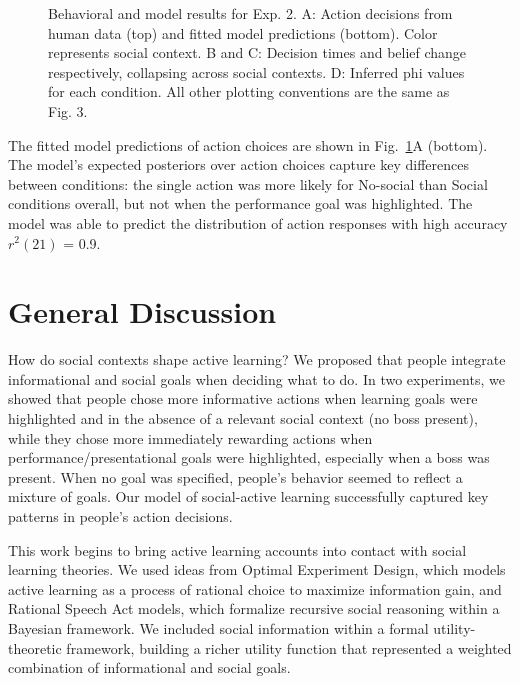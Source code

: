 \documentclass[10pt, letterpaper]{article}
\newenvironment{CodeChunk}{}{}
\begin{document}
\begin{CodeChunk}
\begin{figure}[H]
{}

\caption[Behavioral and model results for Exp]{Behavioral and model results for Exp. 2. A: Action decisions from human data (top) and fitted model predictions (bottom). Color represents social context. B and C: Decision times and belief change respectively, collapsing across social contexts. D: Inferred phi values for each condition. All other plotting conventions are the same as Fig. 3.}\label{fig:e2_results}
\end{figure}
\end{CodeChunk}

The fitted model predictions of action choices are shown in
Fig.~\ref{fig:e2_results}A (bottom). The model's expected posteriors
over action choices capture key differences between conditions: the
single action was more likely for No-social than Social conditions
overall, but not when the performance goal was highlighted. The model
was able to predict the distribution of action responses with high
accuracy \(r^2(21)\) = 0.9.

\section{General Discussion}\label{general-discussion}

How do social contexts shape active learning? We proposed that people
integrate informational and social goals when deciding what to do. In
two experiments, we showed that people chose more informative actions
when learning goals were highlighted and in the absence of a relevant
social context (no boss present), while they chose more immediately
rewarding actions when performance/presentational goals were
highlighted, especially when a boss was present. When no goal was
specified, people's behavior seemed to reflect a mixture of goals. Our
model of social-active learning successfully captured key patterns in
people's action decisions.

This work begins to bring active learning accounts into contact with
social learning theories. We used ideas from Optimal Experiment Design,
which models active learning as a process of rational choice to maximize
information gain, and Rational Speech Act models, which formalize
recursive social reasoning within a Bayesian framework. We included
social information within a formal utility-theoretic framework, building
a richer utility function that represented a weighted combination of
informational and social goals.
\end{document}
